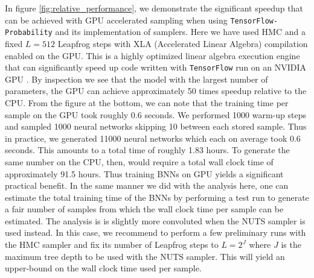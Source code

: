 In figure \ref{fig:relative_performance}, we demonstrate the significant speedup that can be achieved
with GPU accelerated sampling when using {\tt TensorFlow-Probability} and its implementation of samplers. Here we have used HMC and a fixed $L = 512$ Leapfrog steps with XLA (Accelerated Linear Algebra) compilation enabled on the GPU. This is a highly optimized linear algebra execution engine that can significantly speed up code written with {\tt TensorFlow} run on an NVIDIA GPU \cite{xla}. By inspection we see that the model with the largest number of parameters, the GPU can achieve approximately 50 times speedup relative to the CPU.
From the figure at the bottom, we can note that the training time per sample on the GPU took roughly 0.6 seconds. We performed 1000 warm-up steps and sampled 1000 neural networks skipping 10 between each stored sample. Thus in practice, we generated 11000 neural networks which each on average took 0.6 seconds. This amounts to a total time of roughly 1.83 hours. To generate the same number on the CPU, then, would require a total wall clock time of approximately 91.5 hours. Thus training BNNs on GPU yields a significant practical benefit. In the same manner we did with the analysis here, one can estimate the total training time of the BNNs by performing a test run to generate a fair number of samples from which the wall clock time per sample can be estimated. The analysis is is slightly more convoluted when the NUTS sampler is used instead. In this case, we recommend to perform a few preliminary runs with the HMC sampler and fix its number of Leapfrog steps to $L = 2^J$ where $J$ is the maximum tree depth to be used with the NUTS sampler. This will yield an upper-bound on the wall clock time used per sample. 

